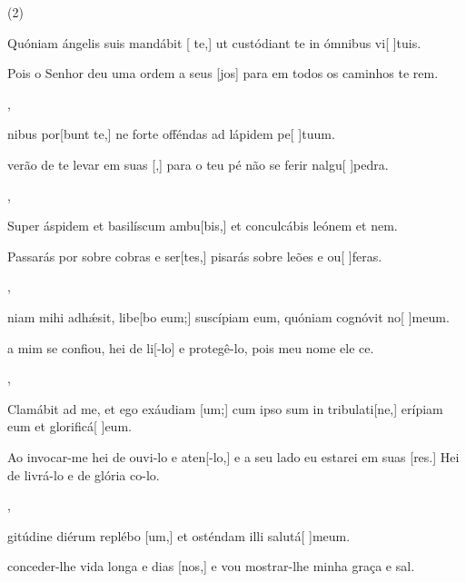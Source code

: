 \SetVersePairs(2){
  {\item {}Quóniam ángelis suis mandábit [ te,] ut custódiant te in ómnibus vi[ ]{tu}is.~\Responsorium}%
    {\item {}Pois o Senhor deu uma ordem a seus [jos] para em todos os caminhos te rem.~\Responsorium},
  {\item {}nibus por[bunt te,] ne forte offéndas ad lápidem pe[ ]{tu}um.~\Responsorium}%
    {\item {}verão de te levar em suas [,] para o teu pé não se ferir nalgu[ ]{pe}dra.~\Responsorium},
  {\item {}Super áspidem et basilíscum ambu[bis,] et conculcábis leónem et nem.~\Responsorium}%
    {\item {}Passarás por sobre cobras e ser[tes,] pisarás sobre leões e ou[ ]{fe}ras.~\Responsorium},
  {\item {}niam mihi adhǽsit, libe[bo eum;] suscípiam eum, quóniam cognóvit no[ ]{me}um.~\Responsorium}%
    {\item {} a mim se confiou, hei de li[-lo] e prote\-gê-lo, pois meu nome ele ce.~\Responsorium},
  {\item {}Clamábit ad me, et ego exáudiam [um;] cum ipso sum in tribulati[ne,] erípiam eum et glorificá[ ]{e}um.~\Responsorium}%
    {\item {}Ao invocar-me hei de ouvi-lo e aten[-lo,] e a seu lado eu estarei em suas [res.] Hei de livrá-lo e de glória co-lo.~\Responsorium},
  {\item {}gitúdine diérum replébo [um,] et osténdam illi salutá[ ]{me}um.~\Responsorium}%
    {\item {} conceder-lhe vida longa e dias [nos,] e vou mostrar-lhe minha graça e sal.~\Responsorium}
}